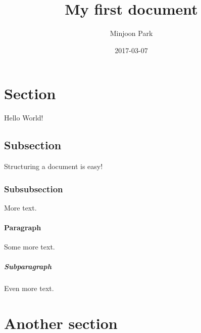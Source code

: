 \documentclass{article}
\title{My first document}
\date{2017-03-07}
\author{Minjoon Park}
\begin{document}
  \maketitle
  \newpage

\section{Section}

Hello World!

\subsection{Subsection}

Structuring a document is easy!

\subsubsection{Subsubsection}

More text.

\paragraph{Paragraph}

Some more text.

\subparagraph{Subparagraph}

Even more text.

\section{Another section}
\end{document}
